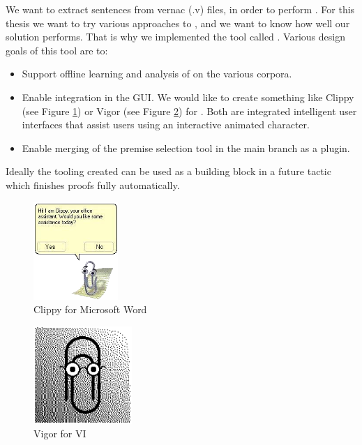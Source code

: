 We want to extract \pcic sentences from \coq vernac (.v) files, in order to perform \premiseselection.
For this thesis we want to try various approaches to \premiseselection,
and we want to know how well our solution performs.
That is why we implemented the \premiseselection tool called \roerei.
Various design goals of this tool are to:
\begin{itemize}
    \item Support offline learning and analysis of \machinelearning on the various corpora.
    \item Enable integration in the \coqide GUI.
		We would like to create something like Clippy (see Figure \ref{figure:clippy}) or Vigor (see Figure \ref{figure:vigor}) for \coq.
		Both are integrated intelligent user interfaces that assist users using an interactive animated character.
    \item Enable merging of the premise selection tool in the \coq main branch as a plugin.
\end{itemize}
Ideally the tooling created can be used as a building block in a future \coq tactic which finishes proofs fully automatically.

\begin{center}
	\begin{minipage}{0.49\linewidth}
		\begin{figure}[H]
			\centering
			\includegraphics[height=10em]{assets/clippy.png}
			\caption{Clippy for Microsoft Word}
			\label{figure:clippy}
		\end{figure}
	\end{minipage}
	\begin{minipage}{0.49\linewidth}
		\begin{figure}[H]
			\centering
			\includegraphics[height=10em]{assets/vigor.png}
			\caption{Vigor for VI}
			\label{figure:vigor}
		\end{figure}
	\end{minipage}
\end{center}

